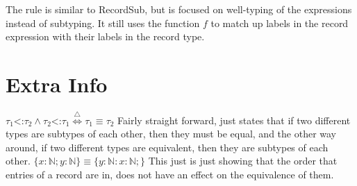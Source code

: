 \documentclass{lecturenotes}
\newcommand{\subtype}{\ensuremath{\mathrel{\mathord{<}\mathord{:}}}}
\begin{document}
\noindent The rule is similar to RecordSub, but is focused on well-typing of the expressions instead of subtyping.
It still uses the function $f$ to match up labels in the record expression with their labels in the record type. \newline

\section{Extra Info}
$\tau_1 \subtype \tau_2 \wedge \tau_2 \subtype \tau_1 \stackrel{\triangle}{\iff} \tau_1 \equiv \tau_2$ \newline
Fairly straight forward, just states that if two different types are subtypes of each other, then they must be equal,
and the other way around, if two different types are equivalent, then they are subtypes of each other. \newline \newline
$\{ x : \mathbb{N} ; y : \mathbb{N} \} \equiv \{ y : \mathbb{N} : x : \mathbb{N} ; \}$ \newline
This just is just showing that the order that entries of a record are in, does not have an effect on the equivalence of them.
\end{document}
